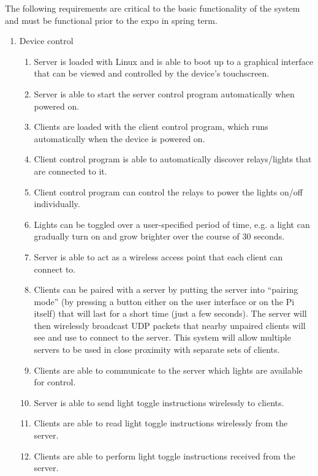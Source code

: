 The following requirements are critical to the basic functionality of the
system and must be functional prior to the expo in spring term.

\begin{enumerate}
    \item Device control
        \begin{enumerate}
            \item Server is loaded with Linux and is able to boot up to a
                graphical interface that can be viewed and controlled by the
                device's touchscreen.
            \item Server is able to start the server control program
                automatically when powered on.
            \item Clients are loaded with the client control program, which
                runs automatically when the device is powered on.
            \item Client control program is able to automatically discover
                relays/lights that are connected to it.
            \item Client control program can control the relays to power the
                lights on/off individually.
            \item Lights can be toggled over a user-specified period of time,
                e.g. a light can gradually turn on and grow brighter over the
                course of 30 seconds.
            \item Server is able to act as a wireless access point that each
                client can connect to.
            \item Clients can be paired with a server by putting the server
                into ``pairing mode'' (by pressing a button either on the user
                interface or on the Pi itself) that will last for a short time
                (just a few seconds). The server will then wirelessly broadcast
                UDP packets that nearby unpaired clients will see and use to
                connect to the server. This system will allow multiple servers
                to be used in close proximity with separate sets of clients.
            \item Clients are able to communicate to the server which lights
                are available for control.
            \item Server is able to send light toggle instructions wirelessly
                to clients.
            \item Clients are able to read light toggle instructions wirelessly
                from the server.
            \item Clients are able to perform light toggle instructions
                received from the server.
        \end{enumerate}


\end{enumerate}
